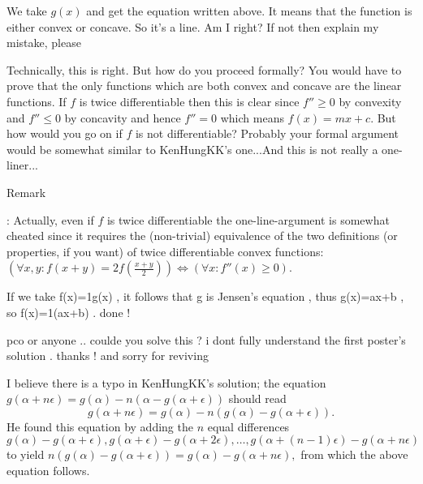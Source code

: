 \begin{solution}
	\begin{tcolorbox}We take $g(x)$ and get the equation written above. It means that the function is either convex or concave. So it's a line. Am I right? If not then explain my mistake, please\end{tcolorbox}

Technically, this is right. But how do you proceed formally? You would have to prove that the only functions which are both convex and concave are the linear functions.
If $f$ is twice differentiable then this is clear since $f'' \ge 0$ by convexity and $f'' \le 0$ by concavity and hence $f''=0$ which means $f(x)=mx+c$. But how would you go on if $f$ is not differentiable? Probably your formal argument would be somewhat similar to KenHungKK's one...And this is not really a one-liner...

\begin{italicized}Remark\end{italicized}: Actually, even if $f$ is twice differentiable the one-line-argument is somewhat cheated since it requires the (non-trivial) equivalence of the two definitions (or properties, if you want) of twice differentiable convex functions: $\left( \forall x,y: f(x+y)=2f \left( \frac{x+y}{2} \right) \right) \Leftrightarrow \left( \forall x: f''(x) \ge 0 \right) $.

\end{solution}



\begin{solution}
	If we take f(x)=1\/g(x) , it follows that g is Jensen's equation , thus g(x)=ax+b , so f(x)=1\/(ax+b) . done !
\end{solution}



\begin{solution}
	pco or anyone .. coulde you solve this ? i dont fully understand the first poster's solution . thanks ! and sorry for reviving

\end{solution}



\begin{solution}
	I believe there is a typo in KenHungKK's solution; the equation $g(\alpha+n\epsilon)=g(\alpha)-n(\alpha-g(\alpha+\epsilon))$ should read \[g(\alpha+n\epsilon)=g(\alpha)-n(g(\alpha)-g(\alpha+\epsilon)).\] He found this equation by adding the $n$ equal differences $g(\alpha)-g(\alpha+\epsilon), g(\alpha+\epsilon)-g(\alpha+2\epsilon), \ldots, g(\alpha+(n-1)\epsilon)-g(\alpha+n\epsilon)$ to yield $n(g(\alpha)-g(\alpha+\epsilon))= g(\alpha) - g(\alpha+n\epsilon),$ from which the above equation follows.
\end{solution}



